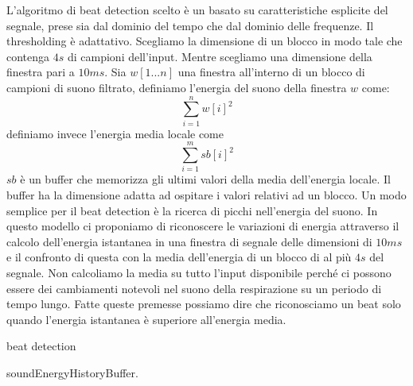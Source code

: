     L'algoritmo di beat detection scelto \`e un basato su caratteristiche esplicite del segnale, prese sia dal dominio del tempo che dal dominio delle frequenze. Il thresholding \`e adattativo.
    Scegliamo la dimensione di un blocco in modo tale che contenga $4s$ di campioni dell'input. 
    Mentre scegliamo una dimensione della finestra pari a $10ms$. 
    Sia $w[1...n]$ una finestra all'interno di un blocco di campioni di suono filtrato, definiamo l'energia del suono della finestra $w$ come:
    \[
      \sum_{i=1}^{n} w[i]^{2}
    \]
    definiamo invece l'energia media locale come 
    \[
      \sum_{i=1}^{m} sb[i]^{2}
    \]
    $sb$ \`e un buffer che memorizza gli ultimi valori della media dell'energia locale. 
    Il buffer ha la dimensione adatta ad ospitare i valori relativi ad un blocco.
    Un modo semplice per il beat detection \`e la ricerca di picchi nell'energia del suono. 
    In questo modello ci proponiamo di riconoscere le variazioni di energia attraverso il calcolo dell'energia istantanea in una finestra di segnale delle dimensioni di $10ms$ e il confronto di questa con la media dell'energia di un blocco di al pi\`u $4s$ del segnale. 
    Non calcoliamo la media su tutto l'input disponibile perch\'e ci possono essere dei cambiamenti notevoli nel suono della respirazione su un periodo di tempo lungo. 
    Fatte queste premesse possiamo dire che riconosciamo un beat solo quando l'energia istantanea \`e superiore all'energia media. 

    \incmargin{1em}
    \linesnumbered
    \begin{algorithm}
      \dontprintsemicolon
      \SetVline
      \caption{beat detection}
      \BlankLine
      soundEnergyHistoryBuffer.\Clear{}\;
      \label{algBeatDet}
    \end{algorithm}
    \decmargin{1em}



